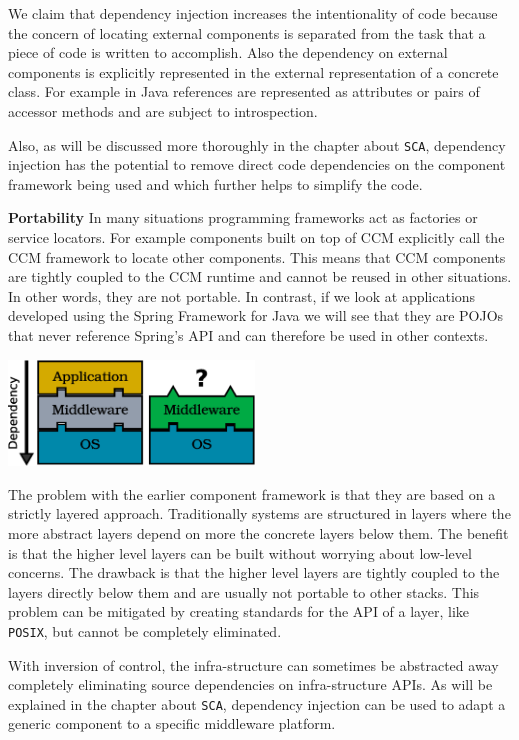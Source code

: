 We claim that dependency injection increases the intentionality of code because the concern of locating external
components is separated from the task that a piece of code is written to accomplish. Also the dependency on external
components is explicitly represented in the external representation of a concrete class. For example in Java
references are represented as attributes or pairs of accessor methods and are subject to introspection.

Also, as will be discussed more thoroughly in the chapter about \texttt{SCA}, dependency injection has the potential
to remove direct code dependencies on the component framework being used and which further helps to simplify the
code.

\textbf{Portability} In many situations programming frameworks act as factories or service locators. For example
components built on top of CCM explicitly call the CCM framework to locate other components. This means that CCM
components are tightly coupled to the CCM runtime and cannot be reused in other situations. In other words, they
are not portable. In contrast, if we look at applications developed using the Spring Framework for Java we will
see that they are POJOs that never reference Spring's API and can therefore be used in other contexts.

\begin{center}
\includegraphics[height=80pt]{graphics_tables/bad_layers.eps} 
\end{center}

The problem with the earlier component framework is that they are based on a strictly layered approach. Traditionally systems
are structured in layers where the more abstract layers depend on more the concrete layers below them. The benefit is that
the higher level layers can be built without worrying about low-level concerns. The drawback is that the higher level
layers are tightly coupled to the layers directly below them and are usually not portable to other stacks.
This problem can be mitigated by creating standards for the API of a layer, like \texttt{POSIX}, but cannot be completely
eliminated. 

With inversion of control, the infra-structure can sometimes be abstracted away completely eliminating source dependencies
on infra-structure APIs. As will be explained in the chapter about \texttt{SCA}, dependency injection can be used to adapt
a generic component to a specific middleware platform.

